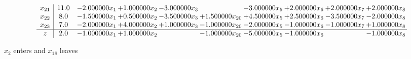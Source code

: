 \documentclass[10pt]{article}
\begin{document}
\[\begin{array}{c| c c@{\hskip 2pt} c@{\hskip 2pt} c@{\hskip 2pt} c@{\hskip 2pt} c@{\hskip 2pt} c@{\hskip 2pt} c@{\hskip 2pt} c@{\hskip 2pt} }
 x_{21}   &  11.0 & -2.000000 x_{1} & + 1.000000 x_{2} & -3.000000 x_{3} &   & -3.000000 x_{5} & + 2.000000 x_{6} & + 2.000000 x_{7} & + 2.000000 x_{8}\\
 x_{22}   &  8.0 & -1.500000 x_{1} & + 0.500000 x_{2} & -3.500000 x_{3} & + 1.500000 x_{20} & + 4.500000 x_{5} & + 2.500000 x_{6} & -3.500000 x_{7} & -2.000000 x_{8}\\
 x_{23}   &  7.0 & -2.000000 x_{1} & + 4.000000 x_{2} & + 1.000000 x_{3} & -1.000000 x_{20} & -2.000000 x_{5} & -1.000000 x_{6} & -1.000000 x_{7} & + 1.000000 x_{8}\\
\hline
z    &  2.0 & -1.000000 x_{1} & + 1.000000 x_{2} &   & -1.000000 x_{20} & -5.000000 x_{5} & -1.000000 x_{6} &   & -1.000000 x_{8}\\
\end{array}\]


 $ x_{2} $ enters and $ x_{18} $ leaves 
\end{document}
